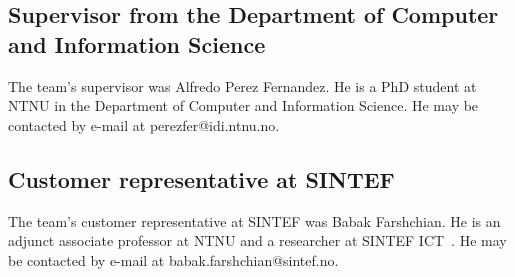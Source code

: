 \subsection{Supervisor from the Department of Computer and Information Science}
The team's supervisor was Alfredo Perez Fernandez. He is a PhD student at NTNU in the Department of Computer and Information Science. He may be contacted by e-mail at perezfer@idi.ntnu.no.

\subsection{Customer representative at SINTEF}
The team's customer representative at SINTEF was Babak Farshchian. He is an adjunct associate professor at NTNU and a researcher at SINTEF ICT~\cite{sintefict}. He may be contacted by e-mail at babak.farshchian@sintef.no.
